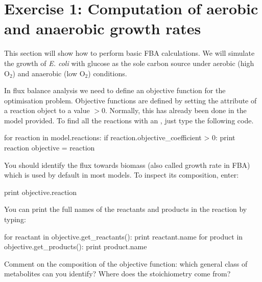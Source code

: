 \pagebreak

\noindent{}

\section*{Exercise 1: Computation of aerobic and anaerobic growth rates}
\setcounter{section}{1}

This section will show how to perform basic FBA calculations.
We will simulate the growth of \textit{E. coli} with glucose as the sole carbon source under aerobic (high O$_2$) and anaerobic (low O$_2$) conditions.

In flux balance analysis we need to define an objective function for the optimisation problem.
Objective functions are defined by setting the  attribute of a reaction object to a value $> 0$.
Normally, this has already been done in the model provided.
To find all the reactions with an , just type the following code.
\begin{code-python}
for reaction in model.reactions:
	if reaction.objective_coefficient > 0:
		print reaction
		objective = reaction
\end{code-python}
You should identify the flux towards biomass (also called growth rate in FBA) which is used by default in most models.
To inspect its composition, enter:
\begin{code-python}
print objective.reaction
\end{code-python}
You can print the full names of the reactants and products in the reaction by typing:
\begin{code-python}
for reactant in objective.get_reactants():
	print reactant.name
for product in objective.get_products():
	print product.name
\end{code-python}

\begin{questions}
\setcounter{question}{0}
\question Comment on the composition of the objective function: which general class of metabolites can you identify? Where does the stoichiometry come from?

\begin{solutionorbox}[5cm]

\end{solutionorbox}

\end{questions}

